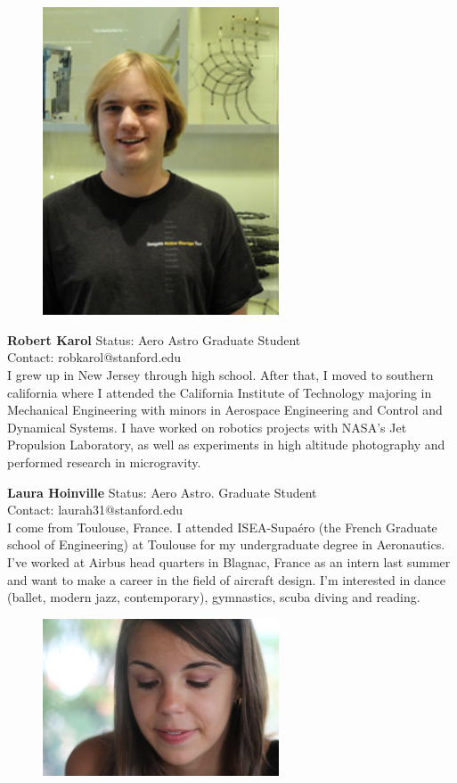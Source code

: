 \begin{figure}[h]
  \centering
     \includegraphics[width=7cm]{images/robert_karol.jpg}
  \label{fig:11}
\end{figure}

\textbf{Robert Karol}
Status: Aero Astro Graduate Student \\
Contact: robkarol@stanford.edu \\
I grew up in New Jersey through high school. After that, I moved to southern california where I attended the California Institute of Technology majoring in Mechanical Engineering with minors in Aerospace Engineering and Control and Dynamical Systems. I have worked on robotics projects with NASA's Jet Propulsion Laboratory, as well as experiments in high altitude photography and performed research in microgravity.

\textbf{Laura Hoinville}
Status: Aero Astro. Graduate Student\\
Contact: laurah31@stanford.edu\\
I come from Toulouse, France. I attended ISEA-Supaéro (the French Graduate school of Engineering) at Toulouse for my undergraduate degree in Aeronautics. I’ve worked at Airbus head quarters in Blagnac, France as an intern last summer and want to make a career in the field of aircraft design. I’m interested in dance (ballet, modern jazz, contemporary), gymnastics, scuba diving and reading.

\begin{figure}[h]
\centering
\includegraphics[width=7cm]{images/image012bis}
\label{fig:12bis}
\end{figure}

